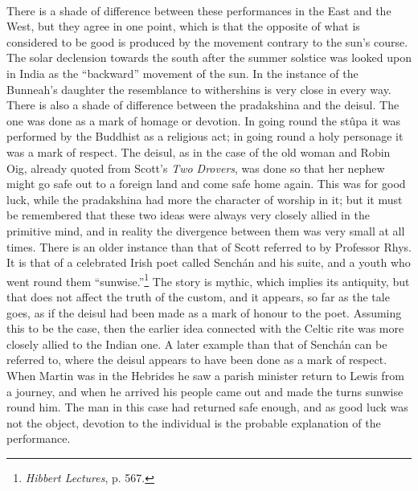 \documentclass[a4paper, 11pt, oneside, polutonikogreek, english]{article}
\begin{document}
\paragraph{}
There is a shade of difference between these performances in the East and the West, but they agree in one point, which is that the opposite of what is considered to be good is produced by the movement contrary to the sun's course. The solar declension towards the south after the summer solstice was looked upon in India as the ``backward'' movement of the sun. In the instance of the Bunneah's daughter the resemblance to withershins is very close in every way. There is also a shade of difference between the pradakshina and the deisul. The one was done as a mark of homage or devotion. In going round the stûpa it was performed by the Buddhist as a religious act; in going round a holy personage it was a mark of respect. The deisul, as in the case of the old woman and Robin Oig, already quoted from Scott's \emph{Two Drovers}, was done so that her nephew might go safe out to a foreign land and come safe home again. This was for good luck, while the pradakshina had more the character of worship in it; but it must be remembered that these two ideas were always very closely allied in the primitive mind, and in reality the divergence between them was very small at all times. There is an older instance than that of Scott referred to by Professor Rhys. It is that of a celebrated Irish poet called Senchán and his suite, and a youth who went round them ``sunwise.''\footnote{\emph{Hibbert Lectures}, p. 567.} The story is mythic, which implies its antiquity, but that does not affect the truth of the custom, and it appears, so far as the tale goes, as if the deisul had been made as a mark of honour to the poet. Assuming this to be the case, then the earlier idea connected with the Celtic rite was more closely allied to the Indian one. A later example than that of Senchán can be referred to, where the deisul appears to have been done as a mark of respect. When Martin was in the Hebrides he saw a parish minister return to Lewis from a journey, and when he arrived his people came out and made the turns sunwise round him. The man in this case had returned safe enough, and as good luck was not the object, devotion to the individual is the probable explanation of the performance.
\end{document}
